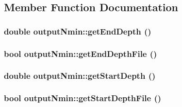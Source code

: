 \subsection{Member Function Documentation}
\hypertarget{classoutput_nmin_ae8ae1e283890490fbb5a88a3e3ff7bb5}{
\subsubsection[{getEndDepth}]{\setlength{\rightskip}{0pt plus 5cm}double outputNmin::getEndDepth ()}}
\label{classoutput_nmin_ae8ae1e283890490fbb5a88a3e3ff7bb5}
\hypertarget{classoutput_nmin_aa56eff79e8399aa26d8d9b265a946712}{
\subsubsection[{getEndDepthFile}]{\setlength{\rightskip}{0pt plus 5cm}bool outputNmin::getEndDepthFile ()}}
\label{classoutput_nmin_aa56eff79e8399aa26d8d9b265a946712}
\hypertarget{classoutput_nmin_ae9d114be97afae6260255b1a6a137c5d}{
\subsubsection[{getStartDepth}]{\setlength{\rightskip}{0pt plus 5cm}double outputNmin::getStartDepth ()}}
\label{classoutput_nmin_ae9d114be97afae6260255b1a6a137c5d}
\hypertarget{classoutput_nmin_a318f67d5b57a4a404d682675fee229cb}{
\subsubsection[{getStartDepthFile}]{\setlength{\rightskip}{0pt plus 5cm}bool outputNmin::getStartDepthFile ()}}
\label{classoutput_nmin_a318f67d5b57a4a404d682675fee229cb}
